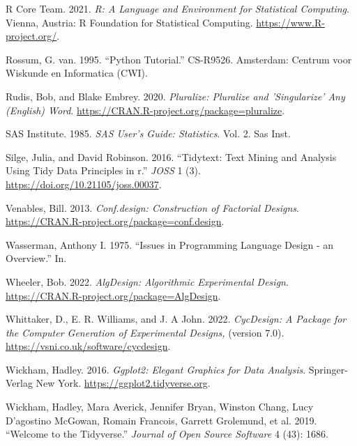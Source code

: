 \documentclass{article}
\newlength{\cslhangindent}
\newlength{\cslentryspacingunit} %
\newenvironment{CSLReferences}[2] %
 {%
  \setlength{\parindent}{0pt}
  \ifodd #1
  \let\oldpar\par
  \def\par{\hangindent=\cslhangindent\oldpar}
  \fi
  \setlength{\parskip}{#2\cslentryspacingunit}
 }%
 {}
\begin{document}
\begin{CSLReferences}{1}{0}
\leavevmode{}%
R Core Team. 2021. \emph{R: A Language and Environment for Statistical
Computing}. Vienna, Austria: R Foundation for Statistical Computing.
\url{https://www.R-project.org/}.

\leavevmode{}%
Rossum, G. van. 1995. {``Python Tutorial.''} CS-R9526. Amsterdam:
Centrum voor Wiskunde en Informatica (CWI).

\leavevmode{}%
Rudis, Bob, and Blake Embrey. 2020. \emph{Pluralize: Pluralize and
'Singularize' Any (English) Word}.
\url{https://CRAN.R-project.org/package=pluralize}.

\leavevmode{}%
SAS Institute. 1985. \emph{SAS User's Guide: Statistics}. Vol. 2. Sas
Inst.

\leavevmode{}%
Silge, Julia, and David Robinson. 2016. {``Tidytext: Text Mining and
Analysis Using Tidy Data Principles in r.''} \emph{JOSS} 1 (3).
\url{https://doi.org/10.21105/joss.00037}.

\leavevmode{}%
Venables, Bill. 2013. \emph{Conf.design: Construction of Factorial
Designs}. \url{https://CRAN.R-project.org/package=conf.design}.

\leavevmode{}%
Wasserman, Anthony I. 1975. {``Issues in Programming Language Design -
an Overview.''} In.

\leavevmode{}%
Wheeler, Bob. 2022. \emph{AlgDesign: Algorithmic Experimental Design}.
\url{https://CRAN.R-project.org/package=AlgDesign}.

\leavevmode{}%
Whittaker, D., E. R. Williams, and J. A John. 2022. \emph{CycDesign: A
Package for the Computer Generation of Experimental Designs,} (version
7.0). \url{https://vsni.co.uk/software/cycdesign}.

\leavevmode{}%
Wickham, Hadley. 2016. \emph{Ggplot2: Elegant Graphics for Data
Analysis}. Springer-Verlag New York.
\url{https://ggplot2.tidyverse.org}.

\leavevmode{}%
Wickham, Hadley, Mara Averick, Jennifer Bryan, Winston Chang, Lucy
D'agostino McGowan, Romain Francois, Garrett Grolemund, et al. 2019.
{``Welcome to the Tidyverse.''} \emph{Journal of Open Source Software} 4
(43): 1686.


\end{CSLReferences}
\end{document}
